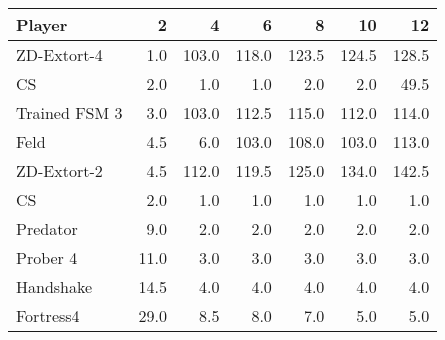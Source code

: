 \begin{tabular}{lrrrrrr}
\toprule
        Player &     2 &      4 &      6 &      8 &     10 &     12 \\
\midrule
   ZD-Extort-4 &   1.0 &  103.0 &  118.0 &  123.5 &  124.5 &  128.5 \\
            CS &   2.0 &    1.0 &    1.0 &    2.0 &    2.0 &   49.5 \\
 Trained FSM 3 &   3.0 &  103.0 &  112.5 &  115.0 &  112.0 &  114.0 \\
          Feld &   4.5 &    6.0 &  103.0 &  108.0 &  103.0 &  113.0 \\
   ZD-Extort-2 &   4.5 &  112.0 &  119.5 &  125.0 &  134.0 &  142.5 \\
            CS &   2.0 &    1.0 &    1.0 &    1.0 &    1.0 &    1.0 \\
      Predator &   9.0 &    2.0 &    2.0 &    2.0 &    2.0 &    2.0 \\
      Prober 4 &  11.0 &    3.0 &    3.0 &    3.0 &    3.0 &    3.0 \\
     Handshake &  14.5 &    4.0 &    4.0 &    4.0 &    4.0 &    4.0 \\
     Fortress4 &  29.0 &    8.5 &    8.0 &    7.0 &    5.0 &    5.0 \\
\bottomrule
\end{tabular}
